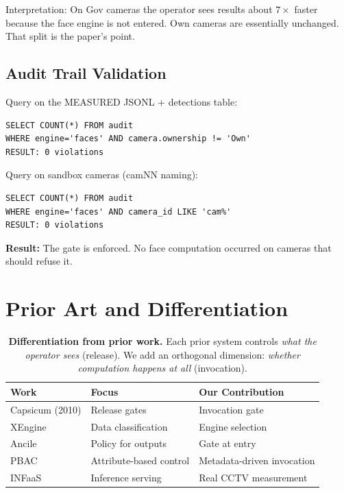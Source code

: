 \documentclass[sigplan,review]{acmart}
\begin{document}
Interpretation: On Gov cameras the operator sees results about $7\times$ faster because the face engine is not entered. Own cameras are essentially unchanged. That split is the paper's point.

\subsection{Audit Trail Validation}

Query on the MEASURED JSONL + detections table:
\begin{lstlisting}
SELECT COUNT(*) FROM audit 
WHERE engine='faces' AND camera.ownership != 'Own'
RESULT: 0 violations
\end{lstlisting}

Query on sandbox cameras (camNN naming):
\begin{lstlisting}
SELECT COUNT(*) FROM audit 
WHERE engine='faces' AND camera_id LIKE 'cam%'
RESULT: 0 violations
\end{lstlisting}

\textbf{Result:} The gate is enforced. No face computation occurred on cameras that should refuse it.

\section{Prior Art and Differentiation}

\begin{table}[h]
  \centering
  \small
  \begin{tabular}{lll}
    \toprule
    \textbf{Work} & \textbf{Focus} & \textbf{Our Contribution} \\
    \midrule
    Capsicum (2010) & Release gates & Invocation gate \\
    XEngine & Data classification & Engine selection \\
    Ancile & Policy for outputs & Gate at entry \\
    PBAC & Attribute-based control & Metadata-driven invocation \\
    INFaaS & Inference serving & Real CCTV measurement \\
    \bottomrule
  \end{tabular}
  \caption{\textbf{Differentiation from prior work.} Each prior system controls \emph{what the operator sees} (release). We add an orthogonal dimension: \emph{whether computation happens at all} (invocation).}
  \label{tab:prior}
\end{table}
\end{document}

